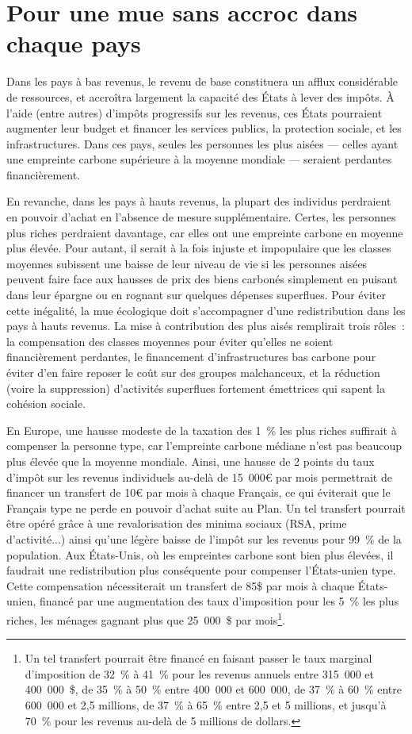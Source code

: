 \documentclass[a5paper,french]{memoir}
\begin{document}
\section{Pour une mue sans accroc dans chaque pays}\label{sec:mue_nationale}

Dans les pays à bas revenus, le revenu de base constituera un afflux considérable de ressources, et accroîtra largement la capacité des États à lever des impôts. À l'aide (entre autres) d'impôts progressifs sur les revenus, ces États pourraient augmenter leur budget et financer les services publics, la protection sociale, et les infrastructures. Dans ces pays, seules les personnes les plus aisées --- celles ayant une empreinte carbone supérieure à la moyenne mondiale --- seraient perdantes financièrement. 

En revanche, dans les pays à hauts revenus, la plupart des individus perdraient en pouvoir d'achat en l'absence de mesure supplémentaire. Certes, les personnes plus riches perdraient davantage, car elles ont une empreinte carbone en moyenne plus élevée. Pour autant, il serait à la fois injuste et impopulaire que les classes moyennes subissent une baisse de leur niveau de vie si les personnes aisées peuvent faire face aux hausses de prix des biens carbonés simplement en puisant dans leur épargne ou en rognant sur quelques dépenses superflues. Pour éviter cette inégalité, la mue écologique doit s'accompagner d'une redistribution dans les pays à hauts revenus. La mise à contribution des plus aisés remplirait trois rôles~: la compensation des classes moyennes pour éviter qu'elles ne soient financièrement perdantes, le financement d'infrastructures bas carbone pour éviter d'en faire reposer le coût sur des groupes malchanceux, %
et la réduction (voire la suppression) d'activités superflues fortement émettrices qui sapent la cohésion sociale.

En Europe, une hausse modeste de la taxation des 1~\% les plus riches suffirait à compenser la personne type, car l'empreinte carbone médiane n'est pas beaucoup plus élevée que la moyenne mondiale. Ainsi, une hausse de 2 points du taux d'impôt sur les revenus individuels au-delà de 15~000\euro{} par mois permettrait de financer un transfert de 10\euro{} par mois à chaque Français, ce qui éviterait que le Français type ne perde en pouvoir d'achat suite au Plan. Un tel transfert pourrait être opéré grâce à une revalorisation des minima sociaux (RSA, prime d'activité...) ainsi qu'une légère baisse de l'impôt sur les revenus pour 99~\% de la population. Aux États-Unis, où les empreintes carbone sont bien plus élevées, il faudrait une redistribution plus conséquente pour compenser l'États-unien type. Cette compensation nécessiterait un transfert de 85\$ par mois à chaque États-unien, financé par une augmentation des taux d'imposition pour les 5~\% les plus riches, les ménages gagnant plus que 25~000~\$ par mois\footnote{Un tel transfert pourrait être financé en faisant passer le taux marginal d'imposition de 32~\% à 41~\% pour les revenus annuels entre 315~000 et 400~000~\$, de 35~\% à 50~\% entre 400~000 et 600~000, de 37~\% à 60~\% entre 600~000 et 2,5 millions, de 37~\% à 65~\% entre 2,5 et 5 millions, et jusqu'à 70~\% pour les revenus au-delà de 5 millions de dollars.}.%
\end{document}
